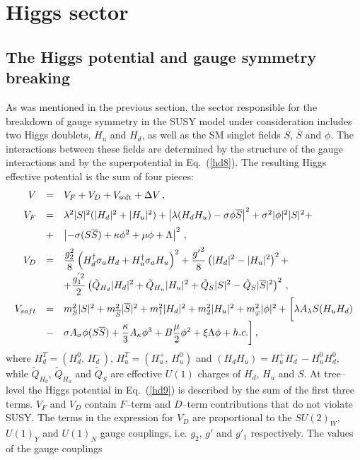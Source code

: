 \documentclass[12pt,a4paper]{article}
\newcommand{\be}{\begin{equation}}
\newcommand{\ee}{\end{equation}}
\newcommand{\ba}{\begin{array}}
\newcommand{\ea}{\end{array}}
\newcommand{\ds}{\displaystyle}
\begin{document}
\section{Higgs sector}
\label{Sec:Higgs-sector}
\subsection{The Higgs potential and gauge symmetry breaking}

As was mentioned in the previous section, the sector responsible for the breakdown of gauge symmetry in the SUSY
model under consideration includes two Higgs doublets, $H_u$ and $H_d$, as well as
the SM singlet fields $S$,
$\overline{S}$ and $\phi$. The interactions between these fields are determined by the structure of the gauge
interactions and by the superpotential in Eq.~(\ref{hd8}). The resulting Higgs effective potential is the sum
of four pieces:
\be
\ba{rcl}
V&=&V_F+V_D+V_{\rm soft}+\Delta V\, ,\\[2mm]
V_F&=&\lambda^2|S|^2(|H_d|^2+|H_u|^2) + \left|\lambda (H_d H_u) - \sigma \phi \overline{S}\right|^2
+ \sigma^2 |\phi|^2 |S|^2 + \\[2mm]
& + &\left| - \sigma (S \overline{S}) + \kappa \phi^2 + \mu \phi + \Lambda \right|^2\,,\\[2mm]
V_D&=&\ds\frac{g_2^2}{8}\left(H_d^\dagger \sigma_a H_d+H_u^\dagger \sigma_a H_u\right)^2
+\frac{{g'}^2}{8}\left(|H_d|^2-|H_u|^2\right)^2+\\[2mm]
&&+\ds\frac{g^{'2}_1}{2}\left(\tilde{Q}_{H_d} |H_d|^2+\tilde{Q}_{H_u} |H_u|^2+\tilde{Q}_S |S|^2 - \tilde{Q}_S |\overline{S}|^2 \right)^2\,,\\[2mm]
V_{soft}&=&m_{S}^2 |S|^2 + m_{\overline{S}}^2 |\overline{S}|^2 + m_1^2|H_d|^2 + m_2^2|H_u|^2 +
m^2_{\varphi}|\phi|^2+ \biggl[\lambda A_{\lambda} S (H_u H_d) \\[2mm]
&-& \sigma A_{\sigma} \phi (S \overline{S}) + \dfrac{\kappa}{3} A_{\kappa} \phi^3 + B\dfrac{\mu}{2} \phi^2 + \xi \Lambda \phi + h.c.\biggr]\,,
\ea
\label{hd9}
\ee
where $H_d^T=(H_d^0,\,H_d^{-})$, $H_u^T=(H_u^{+},\,H_u^{0})$ and $(H_d H_u)=H_u^{+}H_d^{-}-H_u^{0}H_d^{0}$,
while $\tilde{Q}_{H_d}$, $\tilde{Q}_{H_u}$ and $\tilde{Q}_S$ are effective $U(1)$ charges of $H_d$, $H_u$ and $S$.
At tree--level the Higgs potential in Eq.~(\ref{hd9}) is described by the sum of the first three terms. $V_F$ and $V_D$ contain
$F$--term and $D$--term contributions that do not violate SUSY. The terms in the expression for $V_D$ are proportional to
the $SU(2)_W$, $U(1)_Y$ and $U(1)_{N}$ gauge couplings, i.e. $g_2,\,g'$ and $g'_1$ respectively. The values of the gauge couplings
\end{document}
